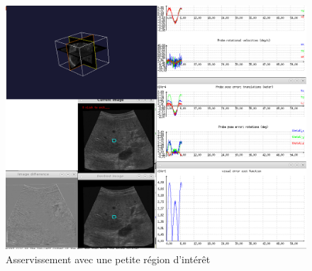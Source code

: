 \documentclass[a4paper,11pt]{article}
\begin{document}
\begin{figure}[H]
    \centering
    \includegraphics[width=0.5\textheight]{./images/q9_small.png}
    \caption{Asservissement avec une petite r\'egion d'int\'er\^et}
    \label{smallRoi}
\end{figure}
\end{document}
